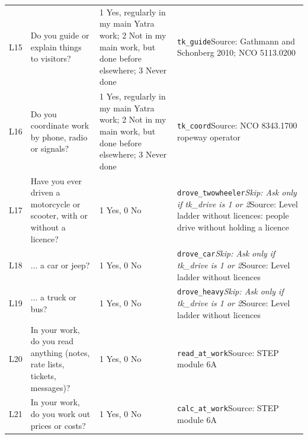 \documentclass[10pt]{article}
\begin{document}
{\begin{longtable}{p{0.8cm}p{6.4cm}p{3.6cm}p{5.8cm}}
L15 & Do you guide or explain things to visitors?  & 1 Yes, regularly in my main Yatra work; 2 Not in my main work, but done before elsewhere; 3 Never done & \texttt{tk\_guide}\newline Source: Gathmann and Schonberg 2010; NCO 5113.0200 \\
L16 & Do you coordinate work by phone, radio or signals?  & 1 Yes, regularly in my main Yatra work; 2 Not in my main work, but done before elsewhere; 3 Never done & \texttt{tk\_coord}\newline Source: NCO 8343.1700 ropeway operator \\
L17 & Have you ever driven a motorcycle or scooter, with or without a licence? & 1 Yes, 0 No & \texttt{drove\_twowheeler}\newline \textit{Skip: Ask only if tk\_drive is 1 or 2}\newline Source: Level ladder without licences: people drive without holding a licence \\
L18 & ... a car or jeep? & 1 Yes, 0 No & \texttt{drove\_car}\newline \textit{Skip: Ask only if tk\_drive is 1 or 2}\newline Source: Level ladder without licences \\
L19 & ... a truck or bus? & 1 Yes, 0 No & \texttt{drove\_heavy}\newline \textit{Skip: Ask only if tk\_drive is 1 or 2}\newline Source: Level ladder without licences \\
L20 & In your work, do you read anything (notes, rate lists, tickets, messages)? & 1 Yes, 0 No & \texttt{read\_at\_work}\newline Source: STEP module 6A \\
L21 & In your work, do you work out prices or costs? & 1 Yes, 0 No & \texttt{calc\_at\_work}\newline Source: STEP module 6A \\
\bottomrule
\end{longtable}
}
\end{document}
